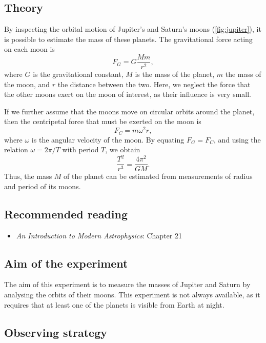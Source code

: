 \documentclass[a4paper, 11pt, fleqn]{memoir}
\begin{document}
\subsection{Theory}

By inspecting the orbital motion of Jupiter's and Saturn's moons (\cref{fig:jupiter}), it is possible to estimate the mass of these planets.
The gravitational force acting on each moon is
\begin{equation*}
    F_G = G \frac{M m}{r^2},
\end{equation*}
where $G$ is the gravitational constant,
$M$ is the mass of the planet,
$m$ the mass of the moon,
and $r$ the distance between the two.
Here, we neglect the force that the other moons exert on the moon of interest, as their influence is very small.

If we further assume that the moons move on circular orbits around the planet, then the centripetal force that must be exerted on the moon is
\begin{equation*}
    F_C = m \omega^2 r,
\end{equation*}
where
$\omega$ is the angular velocity of the moon.
By equating $F_G = F_C$, and using the relation $\omega = 2 \pi / T$ with period $T$, we obtain
\begin{equation}
    \frac{T^2}{r^3} = \frac{4 \pi^2}{G M}.
\end{equation}
Thus, the mass $M$ of the planet can be estimated from measurements of radius and period of its moons.

\subsection{Recommended reading}
\begin{itemize}
    \item \emph{An Introduction to Modern Astrophysics}\autocite{carroll2017introduction}: Chapter 21
\end{itemize}


\subsection{Aim of the experiment}

The aim of this experiment is to measure the masses of Jupiter and Saturn by analysing the orbits of their moons.
This experiment is not always available, as it requires that at least one of the planets is visible from Earth at night.

\subsection{Observing strategy}
\end{document}
